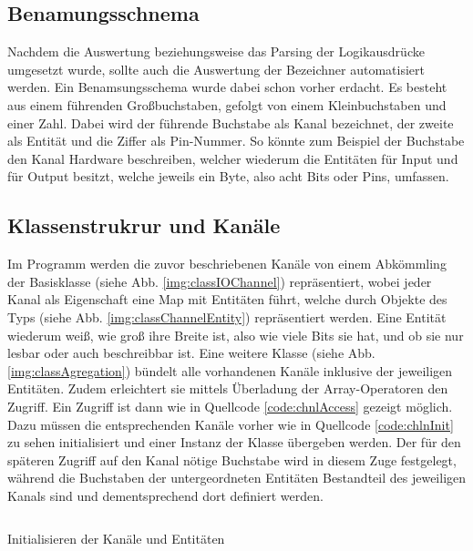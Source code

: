 \subsection{Benamungsschnema}\label{kap:ums:banamsung}
Nachdem die Auswertung beziehungsweise das Parsing der Logikausdrücke umgesetzt wurde, sollte auch die Auswertung der Bezeichner automatisiert werden. Ein Benamsungsschema wurde dabei schon vorher erdacht. Es besteht aus einem führenden Großbuchstaben, gefolgt von einem Kleinbuchstaben und einer Zahl. Dabei wird der führende Buchstabe als Kanal bezeichnet, der zweite als Entität und die Ziffer als Pin-Nummer. So könnte zum Beispiel der Buchstabe  den Kanal Hardware beschreiben, welcher wiederum die Entitäten  für Input und  für Output besitzt, welche jeweils ein Byte, also acht Bits oder Pins, umfassen. 

\subsection{Klassenstrukrur und Kanäle}\label{kap:ums:klassen}
Im Programm werden die zuvor beschriebenen Kanäle von einem Abkömmling der Basisklasse  (siehe Abb. \ref{img:classIOChannel}) repräsentiert, wobei jeder Kanal als Eigenschaft eine Map mit Entitäten führt, welche durch Objekte des Typs  (siehe Abb. \ref{img:classChannelEntity}) repräsentiert werden. Eine Entität wiederum weiß, wie groß ihre Breite ist, also wie viele Bits sie hat, und ob sie nur lesbar oder auch beschreibbar ist. Eine weitere Klasse  (siehe Abb. \ref{img:classAgregation}) bündelt alle vorhandenen Kanäle inklusive der jeweiligen Entitäten. Zudem erleichtert sie mittels Überladung der Array-Operatoren den Zugriff. Ein Zugriff ist dann wie in Quellcode \ref{code:chnlAccess} gezeigt möglich. Dazu müssen die entsprechenden Kanäle vorher wie in Quellcode \ref{code:chlnInit} zu sehen initialisiert und einer Instanz der Klasse  übergeben werden. Der für den späteren Zugriff auf den Kanal nötige Buchstabe wird in diesem Zuge festgelegt, während die Buchstaben der untergeordneten Entitäten Bestandteil des jeweiligen Kanals sind und dementsprechend dort definiert werden. 


\begin{listing}[H]
	\inputminted[numbersep=1pt,fontsize=\scriptsize,frame=single, firstline=364,lastline=369]{c}{./code/main-klassenstruktur.cpp}
	\caption{Initialisieren der Kanäle und Entitäten}
	\label{code:chlnInit}
\end{listing}


